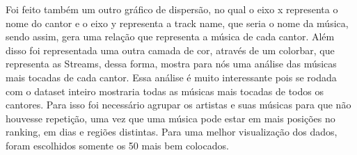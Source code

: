 \documentclass[11pt]{article}
\begin{document}
    Foi feito também um outro gráfico de dispersão, no qual o eixo x
representa o nome do cantor e o eixo y representa a track name, que
seria o nome da música, sendo assim, gera uma relação que representa a
música de cada cantor. Além disso foi representada uma outra camada de
cor, através de um colorbar, que representa as Streams, dessa forma,
mostra para nós uma análise das músicas mais tocadas de cada cantor.
Essa análise é muito interessante pois se rodada com o dataset inteiro
mostraria todas as músicas mais tocadas de todos os cantores. Para isso
foi necessário agrupar os artistas e suas músicas para que não houvesse
repetição, uma vez que uma música pode estar em mais posições no
ranking, em dias e regiões distintas. Para uma melhor visualização dos
dados, foram escolhidos somente os 50 mais bem colocados.
\end{document}
